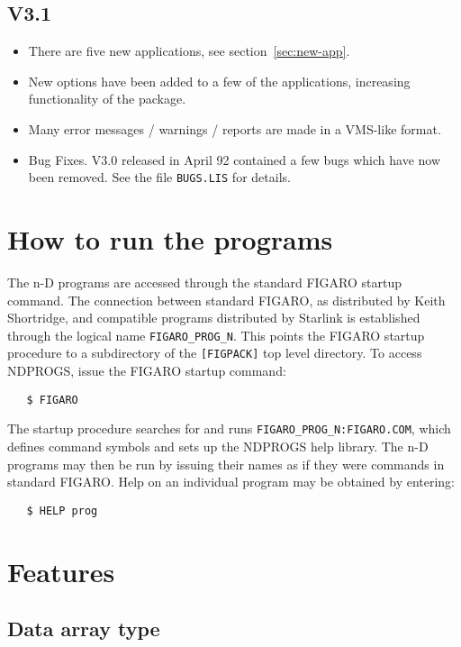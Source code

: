\subsection{V3.1}

\begin{itemize}
\item There are five new applications, see section~\ref{sec:new-app}. 
\item New options have been added to a few of the applications, increasing
functionality of the package.
\item Many error messages / warnings / reports are made in a VMS-like format.
\item Bug Fixes. V3.0 released in April 92 contained a few bugs which have now
been removed. See the file {\tt BUGS.LIS} for details.
\end {itemize}
 
\section{How to run the programs}

The n-D programs are accessed through the standard FIGARO startup command. 
The connection between standard FIGARO, as distributed by Keith Shortridge,
and compatible programs distributed by Starlink is established through the 
logical name {\tt FIGARO\_PROG\_N}. This points the FIGARO startup procedure to
a subdirectory of the {\tt [FIGPACK]} top level directory. To access NDPROGS,
issue the FIGARO startup command:
\begin{verbatim}
   $ FIGARO
\end{verbatim}
The startup procedure searches for and runs {\tt FIGARO\_PROG\_N:FIGARO.COM},
which defines command symbols and sets up the NDPROGS help library. The 
n-D programs may then be run by issuing their names as if they were commands in 
standard FIGARO. Help on an individual program may be obtained  by entering:
\begin{verbatim}
   $ HELP prog
\end{verbatim}

\section{Features}
\label{features}

\subsection{Data array type}

